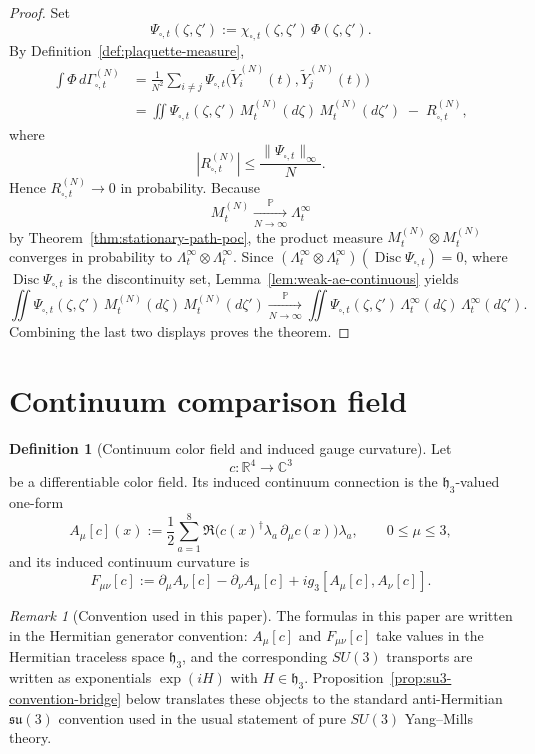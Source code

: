 \documentclass[11pt]{article}
\theoremstyle{definition}
\newtheorem{definition}[theorem]{Definition}
\theoremstyle{remark}
\newtheorem{remark}[theorem]{Remark}
\newcommand{\R}{\mathbb R}
\newcommand{\C}{\mathbb C}
\newcommand{\mathfrakh}{\mathfrak h_3}
\begin{document}
\begin{proof}
Set
\[
\Psi_{\square,t}(\zeta,\zeta')
:=
\chi_{\square,t}(\zeta,\zeta')\,\Phi(\zeta,\zeta').
\]
By Definition~\ref{def:plaquette-measure},
\begin{align*}
\int \Phi\,d\Gamma_{\square,t}^{(N)}
&=
\frac1{N^2}\sum_{i\neq j}
\Psi_{\square,t}\!\bigl(\widetilde Y_i^{(N)}(t),\widetilde Y_j^{(N)}(t)\bigr)\\
&=
\iint \Psi_{\square,t}(\zeta,\zeta')\,M_t^{(N)}(d\zeta)\,M_t^{(N)}(d\zeta')
\;-\;R_{\square,t}^{(N)},
\end{align*}
where
\[
|R_{\square,t}^{(N)}|
\le
\frac{\|\Psi_{\square,t}\|_\infty}{N}.
\]
Hence \(R_{\square,t}^{(N)}\to0\) in probability.
Because
\[
M_t^{(N)}
\xrightarrow[N\to\infty]{\mathbb P}
\Lambda_t^\infty
\]
by Theorem~\ref{thm:stationary-path-poc}, the product measure
\(M_t^{(N)}\otimes M_t^{(N)}\) converges in probability to
\(\Lambda_t^\infty\otimes\Lambda_t^\infty\).
Since \((\Lambda_t^\infty\otimes\Lambda_t^\infty)(\operatorname{Disc}
\Psi_{\square,t})=0\), where \(\operatorname{Disc}\Psi_{\square,t}\) is the
discontinuity set, Lemma~\ref{lem:weak-ae-continuous} yields
\[
\iint \Psi_{\square,t}(\zeta,\zeta')\,M_t^{(N)}(d\zeta)\,M_t^{(N)}(d\zeta')
\xrightarrow[N\to\infty]{\mathbb P}
\iint \Psi_{\square,t}(\zeta,\zeta')\,
\Lambda_t^\infty(d\zeta)\,\Lambda_t^\infty(d\zeta').
\]
Combining the last two displays proves the theorem.
\end{proof}

\section{Continuum comparison field}

\begin{definition}[Continuum color field and induced gauge curvature]
\label{def:continuum-color-field}
Let
\[
c:\R^4\to\C^3
\]
be a differentiable color field. Its induced continuum connection is the
\(\mathfrak h_3\)-valued one-form
\[
A_\mu[c](x)
:=
\frac12\sum_{a=1}^8
\Re\!\bigl(c(x)^\dagger\lambda_a\,\partial_\mu c(x)\bigr)\lambda_a,
\qquad
0\le \mu\le 3,
\]
and its induced continuum curvature is
\[
F_{\mu\nu}[c]
:=
\partial_\mu A_\nu[c]-\partial_\nu A_\mu[c]
+ig_3[A_\mu[c],A_\nu[c]].
\]
\end{definition}

\begin{remark}[Convention used in this paper]
\label{rem:hermitian-convention}
The formulas in this paper are written in the Hermitian generator convention:
\(A_\mu[c]\) and \(F_{\mu\nu}[c]\) take values in the Hermitian traceless space
\(\mathfrakh\), and the corresponding \(SU(3)\) transports are written as
exponentials \(\exp(iH)\) with \(H\in\mathfrakh\).
Proposition~\ref{prop:su3-convention-bridge} below translates these objects to
the standard anti-Hermitian \(\mathfrak{su}(3)\) convention used in the usual
statement of pure \(SU(3)\) Yang--Mills theory.
\end{remark}
\end{document}
